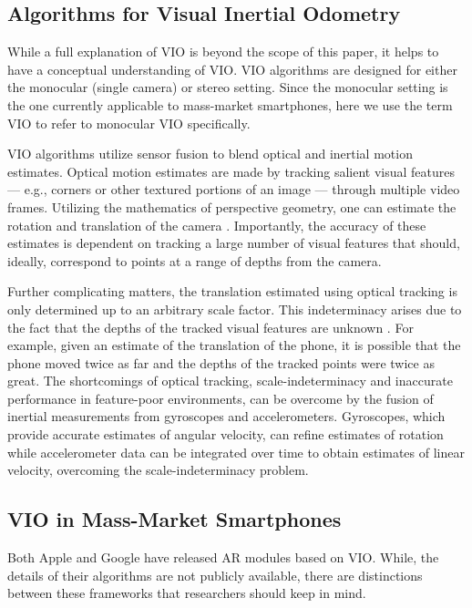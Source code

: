 \documentclass[chi_draft]{sigchi}
\begin{document}
\subsection{Algorithms for Visual Inertial Odometry}
While a full explanation of VIO \cite{gui2015review} is beyond the scope of this paper, it helps to have a conceptual understanding of VIO.  VIO algorithms are designed for either the monocular (single camera) or stereo setting.  Since the monocular setting is the one currently applicable to mass-market smartphones, here we use the term VIO to refer to monocular VIO specifically.

VIO algorithms utilize sensor fusion to blend optical and inertial motion estimates.  Optical motion estimates are made by tracking salient visual features --- e.g., corners or other textured portions of an image --- through multiple video frames.  Utilizing the mathematics of perspective geometry, one can estimate the rotation and translation of the camera \cite{Hartley2004}.  Importantly, the accuracy of these estimates is dependent on tracking a large number of visual features that should, ideally, correspond to points at a range of depths from the camera.%

Further complicating matters, the translation estimated using optical tracking is only determined up to an arbitrary scale factor.  This indeterminacy arises due to the fact that the depths of the tracked visual features are unknown \cite{Hartley2004}.  For example, given an estimate of the translation of the phone, it is possible that the phone moved twice as far and the depths of the tracked points were twice as great.  The shortcomings of optical tracking, scale-indeterminacy and inaccurate performance in feature-poor environments, can be overcome by the fusion of inertial measurements from gyroscopes and accelerometers.  Gyroscopes, which provide accurate estimates of angular velocity, can refine estimates of rotation while accelerometer data can be integrated over time to obtain estimates of linear velocity, overcoming the scale-indeterminacy problem.

\subsection{VIO in Mass-Market Smartphones}
Both Apple and Google have released AR modules based on VIO.  While, the details of their algorithms are not publicly available, there are distinctions between these frameworks that researchers should keep in mind.
\end{document}
